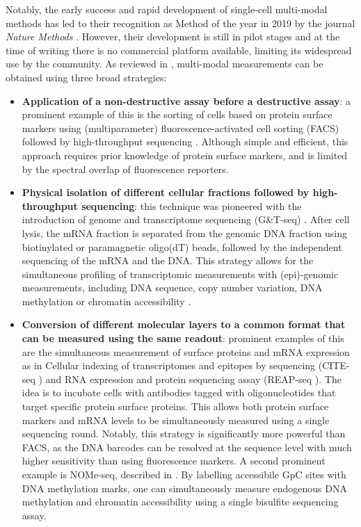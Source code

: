 Notably, the early success and rapid development of single-cell multi-modal methods has led to their recognition as Method of the year in 2019 by the journal \textit{Nature Methods} \cite{NatMethods2020}. However, their development is still in pilot stages and at the time of writing there is no commercial platform available, limiting its widespread use by the community. As reviewed in \cite{Stuart2019,Chappell2018}, multi-modal measurements can be obtained using three broad strategies:
\begin{itemize}
	
	\item \textbf{Application of a non-destructive assay before a destructive assay}: a prominent example of this is the sorting of cells based on protein surface markers using (multiparameter) fluorescence-activated cell sorting (FACS) followed by high-throughput sequencing \cite{Paul2015}. Although simple and efficient, this approach requires prior knowledge of protein surface markers, and is limited by the spectral overlap of fluorescence reporters.

	\item \textbf{Physical isolation of different cellular fractions followed by high-throughput sequencing}: this technique was pioneered with the introduction of genome and transcriptome sequencing (G\&T-seq) \cite{Macaulay2015}. After cell lysis, the mRNA fraction is separated from the genomic DNA fraction using biotinylated or paramagnetic oligo(dT) beads, followed by the independent sequencing of the mRNA and the DNA. This strategy allows for the simultaneous profiling of transcriptomic measurements with (epi)-genomic measurements, including DNA sequence, copy number variation, DNA methylation or chromatin accessibility \cite{Macaulay2015,Hou2016,Angermueller2016,Hu2016}.

	\item \textbf{Conversion of different molecular layers to a common format that can be measured using the same readout}: prominent examples of this are the simultaneous measurement of surface proteins and mRNA expression as in Cellular indexing of transcriptomes and epitopes by sequencing (CITE-seq \cite{Stoeckius2017}) and RNA expression and protein sequencing assay (REAP-seq \cite{Peterson2017}). The idea is to incubate cells with antibodies tagged with oligonucleotides that target specific protein surface proteins. This allows both protein surface markers and mRNA levels to be simultaneously measured using a single sequencing round. Notably, this strategy is significantly more powerful than FACS, as the DNA barcodes can be resolved at the sequence level with much higher sensitivity than using fluorescence markers. A second prominent example is NOMe-seq, described in . By labelling accessibile GpC sites with DNA methylation marks, one can simultaneously measure endogenous DNA methylation and chromatin accessibility using a single bisulfite sequencing assay.
\end{itemize}

